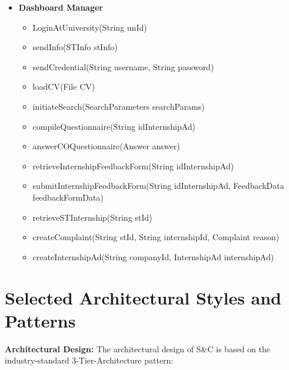 \begin{itemize}
      \item \textbf{Dashboard Manager}
          \begin{itemize}
              \item LoginAtUniversity(String unId)
              \item sendInfo(STInfo stInfo)
              \item sendCredential(String username, String password)
              \item loadCV(File CV)
              \item initiateSearch(SearchParameters searchParams)
              \item compileQuestionnaire(String idInternshipAd)
              \item answerCOQuestionnaire(Answer answer)
              \item retrieveInternshipFeedbackForm(String idInternshipAd)
              \item submitInternshipFeedbackForm(String idInternshipAd, FeedbackData feedbackFormData)
              \item retrieveSTInternship(String stId)
              \item createComplaint(String stId, String internshipId, Complaint reason)
              \item createInternshipAd(String companyId, InternshipAd internshipAd)
          \end{itemize}
  
  \end{itemize}

\section{Selected Architectural Styles and Patterns}
\label{sec:selected-architectural-styles-patterns}%

\par{\textbf{Architectural Design:}} The architectural design of S\&C is based on the industry-standard 3-Tier-Architecture pattern:

